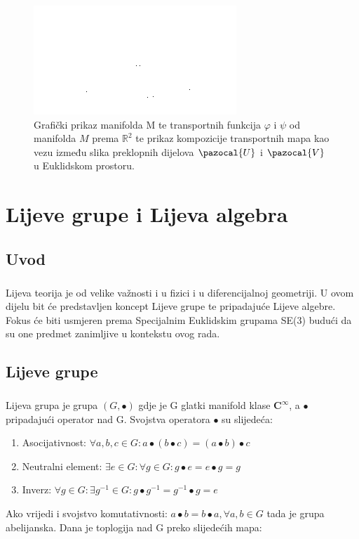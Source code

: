 \documentclass[times, utf8, diplomski]{fer}
\newcommand{\Va}{\pazocal{V}}
\newcommand{\Ua}{\pazocal{U}}
\begin{document}
	\begin{figure}[h]
		\includegraphics[width=\textwidth]{fig_overlap_charts.png}
		\caption{Grafički prikaz manifolda M te transportnih funkcija $\varphi$ i $\psi$ od manifolda $M$ prema $\mathbb{R}^2$ te prikaz kompozicije transportnih mapa kao vezu između slika preklopnih dijelova $\Ua$ i $\Va$ u Euklidskom prostoru.}
	\end{figure}
\chapter{Lijeve grupe i Lijeva algebra}

\section{Uvod}

	\paragraph{}Lijeva teorija je od velike važnosti i u fizici i u diferencijalnoj geometriji. U ovom dijelu bit će predstavljen koncept Lijeve grupe te pripadajuće Lijeve algebre. Fokus će biti usmjeren prema Specijalnim Euklidskim grupama SE(3) budući da su one predmet zanimljive u kontekstu ovog rada.
	
\section{Lijeve grupe}

	\paragraph{} Lijeva grupa je grupa $(G, \bullet)$ gdje je G glatki manifold klase $\boldsymbol{C}^\infty$, a $\bullet$ pripadajući operator nad G. Svojstva operatora $\bullet$ su slijedeća: 
	\begin{enumerate}
		\item Asocijativnost: $\forall a, b, c \in G :  a\bullet(b\bullet c) = (a\bullet b) \bullet c$
		\item Neutralni element: $\exists e \in G : \forall g \in G : g \bullet e = e \bullet g = g$
		\item Inverz: $\forall g \in G : \exists g^{-1} \in G : g \bullet g^{-1} = g^{-1} \bullet g = e$
	\end{enumerate}
	Ako vrijedi i svojstvo komutativnosti: $a \bullet b = b \bullet a, \forall a, b \in G$ tada je grupa abelijanska. Dana je toplogija nad G preko slijedećih mapa:
	
\end{document}
